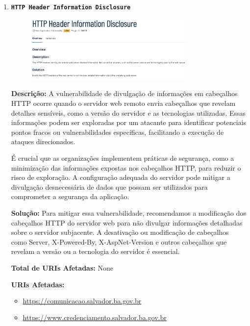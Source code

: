 \documentclass[a4paper,12pt]{article}
\begin{document}
\begin{enumerate}
\item \textbf{\texttt{HTTP Header Information Disclosure}}

                        \begin{figure}[h!]
                        \centering
                        \includegraphics[width=0.8\textwidth]{assets/images-was/Vulnerabilidades Relacionadas a Configurações de Segurança HTTP E TLS/HTTP_header_Information_disclosure.png}
                        \end{figure}
                        \FloatBarrier
                        \textbf{Descrição:} A vulnerabilidade de divulgação de informações em cabeçalhos HTTP ocorre quando o servidor web remoto envia cabeçalhos que revelam detalhes sensíveis, como a versão do servidor e as tecnologias utilizadas. Essas informações podem ser exploradas por um atacante para identificar potenciais pontos fracos ou vulnerabilidades específicas, facilitando a execução de ataques direcionados.

    É crucial que as organizações implementem práticas de segurança, como a minimização das informações expostas nos cabeçalhos HTTP, para reduzir o risco de exploração. A configuração adequada do servidor pode mitigar a divulgação desnecessária de dados que possam ser utilizados para comprometer a segurança da aplicação.

\textbf{Solução:} Para mitigar essa vulnerabilidade, recomendamos a modificação dos cabeçalhos HTTP do servidor web para não divulgar informações detalhadas sobre o servidor subjacente. A desativação ou modificação de cabeçalhos como Server, X-Powered-By, X-AspNet-Version e outros cabeçalhos que revelam a versão ou a tecnologia do servidor é essencial.

\textbf{Total de URIs Afetadas:} None

\textbf{URIs Afetadas:}
\begin{itemize}
    \item \url{https://comunicacao.salvador.ba.gov.br}
    \item \url{https://www.credenciamento.salvador.ba.gov.br}
\end{itemize}


\end{enumerate}
\end{document}
